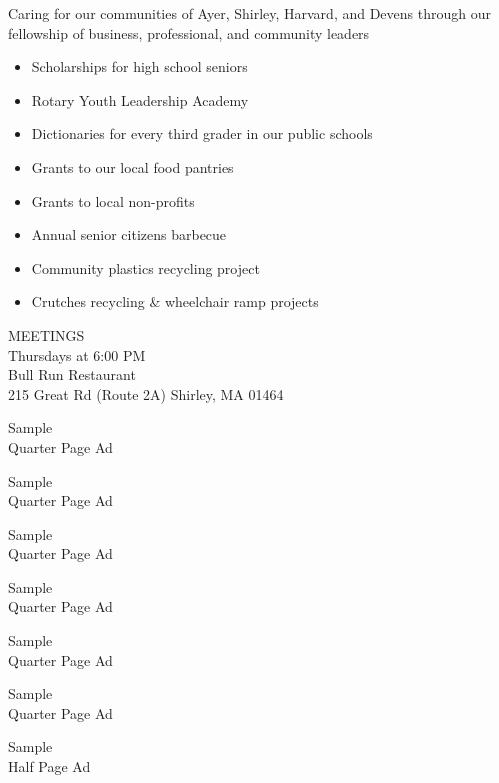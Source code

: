 \documentclass[12pt, a5paper, oneside]{article}
\begin{document}
Caring for our communities of Ayer, Shirley, Harvard, and Devens through our fellowship of business, professional, and community leaders 
\begin{itemize}
\setlength\itemsep{0.1em}
\item Scholarships for high school seniors 
\item Rotary Youth Leadership Academy 
\item Dictionaries for every third grader in our public schools 
\item Grants to our local food pantries 
\item Grants to local non-profits 
\item Annual senior citizens barbecue 
\item Community plastics recycling project 
\item Crutches recycling \& wheelchair ramp projects
\end{itemize} 
\center MEETINGS\\ 
Thursdays at 6:00 PM \\ 
Bull Run Restaurant\\215 Great Rd (Route 2A)
Shirley, MA 01464
\pagebreak
\begin{minipage}[c][0.5\textheight]{0.5\linewidth}
\centering
    \Large Sample \\Quarter Page Ad
\end{minipage}
\begin{minipage}[b][0.5\textheight]{0.5\linewidth}
\centering
    \Large Sample \\Quarter Page Ad
\end{minipage}
\begin{minipage}[c][0.5\textheight]{0.5\linewidth}
\centering
    \Large Sample \\Quarter Page Ad
\end{minipage}
\begin{minipage}[c][0.5\textheight]{0.5\linewidth}
\centering
    \Large Sample \\Quarter Page Ad
\end{minipage}

\begin{minipage}[c][0.5\textheight]{0.5\linewidth}
\begin{framed}
\centering
    \Large Sample \\Quarter Page Ad
\end{framed}
\end{minipage}
\begin{minipage}[c][0.5\textheight]{0.5\linewidth}
\centering
    \Large Sample \\Quarter Page Ad
\end{minipage}
\begin{minipage}[c][0.25\textheight]{\linewidth}
\centering
    \Large Sample \\ Half Page Ad
\end{minipage}
\end{document}
